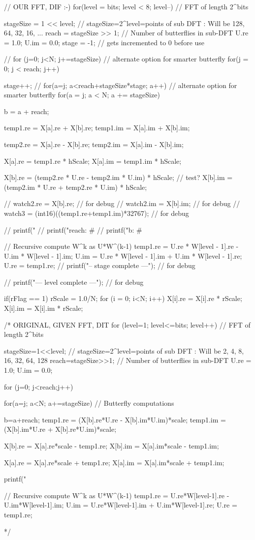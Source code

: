 \documentclass{bannerReport}
\begin{document}
\begin{code}
{	// OUR FFT, DIF :-)
	for(level = bits; level < 8; level--) 	// FFT of length 2^bits 
	{
		stageSize = 1 << level;        	// stageSize=2^level=points of sub 
		DFT
		: Will be 128, 64, 32, 16, ... 
		reach = stageSize >> 1;      	// Number of butterflies in sub-DFT 
		U.re  = 1.0;
		U.im  = 0.0;
		stage = -1;					// gets incremented to 0 before use

		// for (j=0; j<N; j+=stageSize)		// alternate option for smarter
		butterfly
		for(j = 0; j < reach; j++)
		{
			stage++;
			// for(a=j; a<reach+stageSize*stage; a++) // alternate option for
			smarter butterfly
			for(a = j; a < N; a += stageSize)
			{
				b = a + reach;

				temp1.re = X[a].re + X[b].re;
				temp1.im = X[a].im + X[b].im;

				temp2.re = X[a].re - X[b].re;
				temp2.im = X[a].im - X[b].im;

				X[a].re = temp1.re * hScale;
				X[a].im = temp1.im * hScale;

				X[b].re = (temp2.re * U.re - temp2.im * U.im) * hScale; // 
				test?
				X[b].im = (temp2.im * U.re + temp2.re * U.im) * hScale;

				// watch2.re = X[b].re;							// for debug
				// watch2.im = X[b].im;							// for debug
				// watch3 = (int16)((temp1.re+temp1.im)*32767);	// for debug

				// printf("%
				// printf("reach: #%
				// printf("b: #%
			}
			
			// Recursive compute W^k as U*W^(k-1) 
			temp1.re = U.re * W[level - 1].re - U.im * W[level - 1].im;
			U.im	 = U.re * W[level - 1].im + U.im * W[level - 1].re;
			U.re	 = temp1.re;
			// printf("-- stage complete ---\n");	// for debug
		}
		// printf("\n--- level complete ---\n");	// for debug
	}

	if(rFlag == 1)
	{
		rScale = 1.0/N;
		for (i = 0;	 i<N; i++)
		{
			X[i].re = X[i].re * rScale;
			X[i].im = X[i].im * rScale;
		}
	}    
}

		/* ORIGINAL, GIVEN FFT, DIT
		for (level=1; level<=bits; level++) 	// FFT of length 2^bits 
		{
			stageSize=1<<level;        	// stageSize=2^level=points of sub 
			DFT 
			: Will be 2, 4, 8, 16, 32, 64, 128 
			reach=stageSize>>1;      	// Number of butterflies in sub-DFT 
			U.re = 1.0;
			U.im = 0.0;
	
			for (j=0; j<reach;j++)
			{
				for(a=j; a<N; a+=stageSize) // Butterfly computations 
				{
					b=a+reach;
					temp1.re = (X[b].re*U.re - X[b].im*U.im)*scale;
					temp1.im = (X[b].im*U.re + X[b].re*U.im)*scale;
	
					X[b].re = X[a].re*scale - temp1.re;
					X[b].im = X[a].im*scale - temp1.im;
	
					X[a].re = X[a].re*scale + temp1.re;
					X[a].im = X[a].im*scale + temp1.im;
	
					printf("%
				}
				
				// Recursive compute W^k as U*W^(k-1) 
				temp1.re = U.re*W[level-1].re - U.im*W[level-1].im;
				U.im = U.re*W[level-1].im + U.im*W[level-1].re;
				U.re = temp1.re;
			}
		}
	*/
\end{code}
\end{document}
